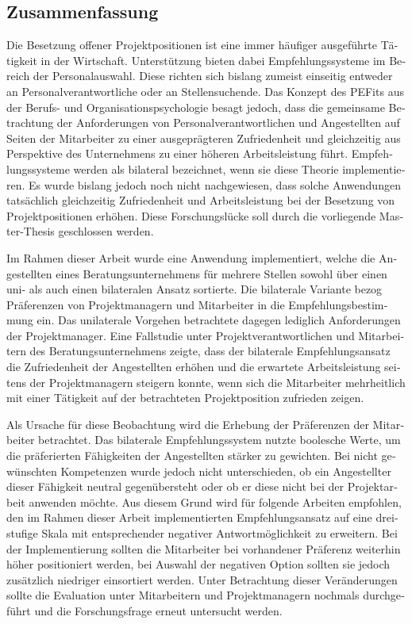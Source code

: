 \begin{otherlanguage}{ngerman}
\chapter*{Zusammenfassung}
Die Besetzung offener Projektpositionen ist eine immer häufiger ausgeführte Tätigkeit in der Wirtschaft. Unterstützung bieten dabei Empfehlungssysteme im Bereich der Personalauswahl. Diese richten sich bislang zumeist einseitig entweder an Personalverantwortliche oder an Stellensuchende. Das Konzept des \aclp{PEFit} aus der Berufs- und Organisationspsychologie besagt jedoch, dass die gemeinsame Betrachtung der Anforderungen von Personalverantwortlichen und Angestellten auf Seiten der Mitarbeiter zu einer ausgeprägteren Zufriedenheit und gleichzeitig aus Perspektive des Unternehmens zu einer höheren Arbeitsleistung führt. Empfehlungssysteme werden als bilateral bezeichnet, wenn sie diese Theorie implementieren. Es wurde bislang jedoch noch nicht nachgewiesen, dass solche Anwendungen tatsächlich gleichzeitig Zufriedenheit und Arbeitsleistung bei der Besetzung von Projektpositionen erhöhen. Diese Forschungslücke soll durch die vorliegende Master-Thesis geschlossen werden.

Im Rahmen dieser Arbeit wurde eine Anwendung implementiert, welche die Angestellten eines Beratungsunternehmens für mehrere Stellen sowohl über einen uni- als auch einen bilateralen Ansatz sortierte. Die bilaterale Variante bezog Präferenzen von Projektmanagern und Mitarbeiter in die Empfehlungsbestimmung ein. Das unilaterale Vorgehen betrachtete dagegen lediglich Anforderungen der Projektmanager. Eine Fallstudie unter Projektverantwortlichen und Mitarbeitern des Beratungsunternehmens zeigte, dass der bilaterale Empfehlungsansatz die Zufriedenheit der Angestellten erhöhen und die erwartete Arbeitsleistung seitens der Projektmanagern steigern konnte, wenn sich die Mitarbeiter mehrheitlich mit einer Tätigkeit auf der betrachteten Projektposition zufrieden zeigen.

Als Ursache für diese Beobachtung wird die Erhebung der Präferenzen der Mitarbeiter betrachtet. Das bilaterale Empfehlungssystem nutzte boolesche Werte, um die präferierten Fähigkeiten der Angestellten stärker zu gewichten. Bei nicht gewünschten Kompetenzen wurde jedoch nicht unterschieden, ob ein Angestellter dieser Fähigkeit neutral gegenübersteht oder ob er diese nicht bei der Projektarbeit anwenden möchte. Aus diesem Grund wird für folgende Arbeiten empfohlen, den im Rahmen dieser Arbeit implementierten Empfehlungsansatz auf eine dreistufige Skala mit entsprechender negativer Antwortmöglichkeit zu erweitern. Bei der Implementierung sollten die Mitarbeiter bei vorhandener Präferenz weiterhin höher positioniert werden, bei Auswahl der negativen Option sollten sie jedoch zusätzlich niedriger einsortiert werden. Unter Betrachtung dieser Veränderungen sollte die Evaluation unter Mitarbeitern und Projektmanagern nochmals durchgeführt und die Forschungsfrage erneut untersucht werden.
\end{otherlanguage}
